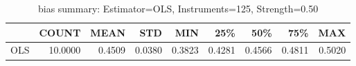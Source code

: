 \begin{table}[ht]
\centering
\caption{bias summary: Estimator=OLS, Instruments=125, Strength=0.50}
\begin{tabular}{lrrrrrrrr}
\toprule
 & COUNT & MEAN & STD & MIN & 25\% & 50\% & 75\% & MAX \\
\midrule
OLS & 10.0000 & 0.4509 & 0.0380 & 0.3823 & 0.4281 & 0.4566 & 0.4811 & 0.5020 \\
\bottomrule
\end{tabular}
\end{table}
